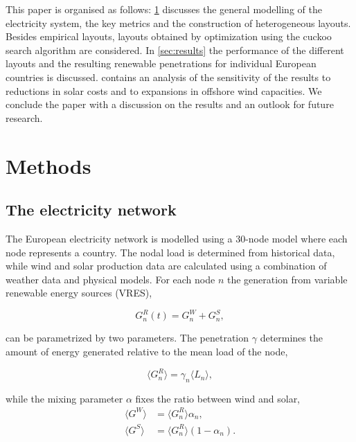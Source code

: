 \documentclass[a4paper, 12pt, sort&compress]{elsarticle}%
\newcommand{\mean}[1]{\langle #1 \rangle}
\newcommand{\paren}[1]{\left(#1\right)}
\begin{document}
This paper is organised as follows: \cref{sec:two} discusses the
general modelling of the electricity system, the key metrics and the
construction of heterogeneous layouts. Besides empirical layouts,
layouts obtained by optimization using the cuckoo search algorithm are
considered. In \cref{sec:results} the performance of the different
layouts and the resulting renewable penetrations for individual
European countries is discussed. 
contains an analysis of the sensitivity of the results to reductions
in solar costs and to expansions in offshore wind capacities. We
conclude the paper with a discussion on the results and an outlook for
future research.

\section{Methods}
\label{sec:two}
\subsection{The electricity network}

The European electricity network is modelled using a 30-node model
where each node represents a country. The nodal load is determined
from historical data, while wind and solar production data are
calculated using a combination of weather data and physical
models\cite{REA}. For each node $n$ the generation from variable
renewable energy sources (VRES),

\begin{equation}
  G^{R}_{n}(t) = G_{n}^{W} + G_{n}^{S},
\end{equation} 

can be parametrized by two parameters. The penetration $\gamma$ determines
the amount of energy generated relative to the mean load of the node,

\begin{equation}
  \mean{G^{R}_{n}} = \gamma_{n} \mean{L_{n}} ,
\end{equation} 

while the mixing parameter $\alpha$ fixes the ratio between wind and solar,
\begin{align}
  \mean{G^{W}} &= \mean{G_{n}^{R}} \alpha_{n}  , \\
  \mean{G^{S}} &= \mean{G_{n}^{R}} \paren{1- \alpha_{n}}  .
\end{align} 
\end{document}
